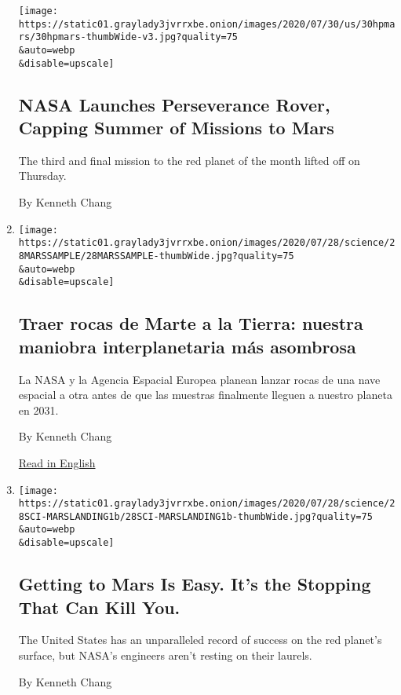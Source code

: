 \begin{enumerate}
  \texttt{[image: https://static01.graylady3jvrrxbe.onion/images/2020/07/30/us/30hpmars/30hpmars-thumbWide-v3.jpg?quality=75\\\&auto=webp\\\&disable=upscale]}

  \hypertarget{nasa-launches-perseverance-rover-capping-summer-of-missions-to-mars}{%
  \subsection{NASA Launches Perseverance Rover, Capping Summer of
  Missions to
  Mars}\label{nasa-launches-perseverance-rover-capping-summer-of-missions-to-mars}}

  The third and final mission to the red planet of the month lifted off
  on Thursday.

  By Kenneth Chang
\item
  \href{/es/2020/07/29/espanol/ciencia-y-tecnologia/mision-marte-nasa.html}{}

  \texttt{[image: https://static01.graylady3jvrrxbe.onion/images/2020/07/28/science/28MARSSAMPLE/28MARSSAMPLE-thumbWide.jpg?quality=75\\\&auto=webp\\\&disable=upscale]}

  \hypertarget{traer-rocas-de-marte-a-la-tierra-nuestra-maniobra-interplanetaria-muxe1s-asombrosa}{%
  \subsection{Traer rocas de Marte a la Tierra: nuestra maniobra
  interplanetaria más
  asombrosa}\label{traer-rocas-de-marte-a-la-tierra-nuestra-maniobra-interplanetaria-muxe1s-asombrosa}}

  La NASA y la Agencia Espacial Europea planean lanzar rocas de una nave
  espacial a otra antes de que las muestras finalmente lleguen a nuestro
  planeta en 2031.

  By Kenneth Chang

  \href{https://www.nytimes3xbfgragh.onion/2020/07/28/science/mars-sample-return-mission.html}{Read
  in English}
\item
  \href{/2020/07/29/science/nasa-mars-perseverance-rover.html}{}

  \texttt{[image: https://static01.graylady3jvrrxbe.onion/images/2020/07/28/science/28SCI-MARSLANDING1b/28SCI-MARSLANDING1b-thumbWide.jpg?quality=75\\\&auto=webp\\\&disable=upscale]}

  \hypertarget{getting-to-mars-is-easy-its-the-stopping-that-can-kill-you}{%
  \subsection{Getting to Mars Is Easy. It's the Stopping That Can Kill
  You.}\label{getting-to-mars-is-easy-its-the-stopping-that-can-kill-you}}

  The United States has an unparalleled record of success on the red
  planet's surface, but NASA's engineers aren't resting on their
  laurels.

  By Kenneth Chang
\end{enumerate}


